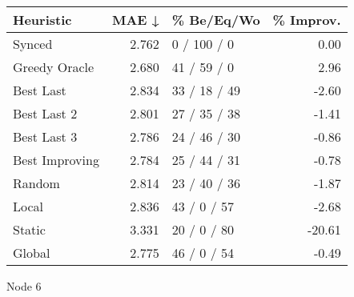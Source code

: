 \begin{tabular}{lrlr}
\toprule
\textbf{Heuristic} & \textbf{MAE ↓} & \textbf{\% Be/Eq/Wo} & \textbf{\% Improv.} \\
\midrule
            Synced &          2.762 &          0 / 100 / 0 &                0.00 \\
     Greedy Oracle &          2.680 &          41 / 59 / 0 &                2.96 \\
         Best Last &          2.834 &         33 / 18 / 49 &               -2.60 \\
       Best Last 2 &          2.801 &         27 / 35 / 38 &               -1.41 \\
       Best Last 3 &          2.786 &         24 / 46 / 30 &               -0.86 \\
    Best Improving &          2.784 &         25 / 44 / 31 &               -0.78 \\
            Random &          2.814 &         23 / 40 / 36 &               -1.87 \\
             Local &          2.836 &          43 / 0 / 57 &               -2.68 \\
            Static &          3.331 &          20 / 0 / 80 &              -20.61 \\
            Global &          2.775 &          46 / 0 / 54 &               -0.49 \\
\bottomrule
\end{tabular}
\caption{Node 6}
\label{tab:hr_iid_lr05_le1_bs2_6}
